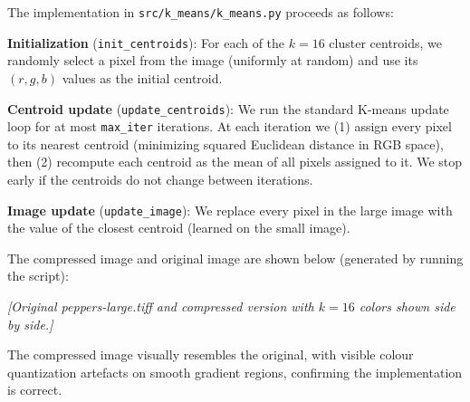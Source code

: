 \begin{answer}
The implementation in \texttt{src/k\_means/k\_means.py} proceeds as follows:

\textbf{Initialization} (\texttt{init\_centroids}): For each of the $k=16$ cluster centroids, we randomly select a pixel from the image (uniformly at random) and use its $(r,g,b)$ values as the initial centroid.

\textbf{Centroid update} (\texttt{update\_centroids}): We run the standard K-means update loop for at most \texttt{max\_iter} iterations. At each iteration we (1) assign every pixel to its nearest centroid (minimizing squared Euclidean distance in RGB space), then (2) recompute each centroid as the mean of all pixels assigned to it. We stop early if the centroids do not change between iterations.

\textbf{Image update} (\texttt{update\_image}): We replace every pixel in the large image with the value of the closest centroid (learned on the small image).

The compressed image and original image are shown below (generated by running the script):

\begin{center}
\textit{[Original peppers-large.tiff and compressed version with $k=16$ colors shown side by side.]}
\end{center}

The compressed image visually resembles the original, with visible colour quantization artefacts on smooth gradient regions, confirming the implementation is correct.
\end{answer}
